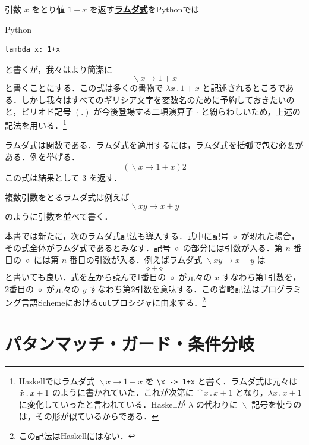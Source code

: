 \documentclass[a4paper,twocolumn]{jsbook}
\newcommand{\programminglanguage}[1]{\textsf{#1}}
\newcommand{\haskell}{\programminglanguage{Haskell}}
\newcommand{\python}{\programminglanguage{Python}}
\newcommand{\scheme}{\programminglanguage{Scheme}}
\newcommand{\keyword}[1]{{\underline{\textbf{#1}}}}
\newcommand{\code}[1]{\texttt{#1}}
\newenvironment{pythoncode}{\begin{itembox}[r]{\python}}{\end{itembox}}
\newcommand{\mAnonParam}{\diamond}
\DeclareMathOperator{\mLambda}{\backslash}
\DeclareMathOperator{\mLambdaArrow}{\rightarrow}
\newcommand{\mLambdaExp}[2]{\mLambda{#1}\mLambdaArrow{#2}}
\begin{document}
引数 $x$ をとり値 $1+x$ を返す\keyword{ラムダ式}を\python では
\begin{pythoncode}
\begin{verbatim}
lambda x: 1+x
\end{verbatim}
\end{pythoncode}
と書くが，我々はより簡潔に
\begin{equation}
\mLambdaExp{x}{1+x}
\end{equation}
と書くことにする．この式は多くの書物で $\lambda x\mathbin{.}1+x$ と記述されるところである．しかし我々はすべてのギリシア文字を変数名のために予約しておきたいのと，ピリオド記号 $(.)$ が今後登場する二項演算子 $\cdot$ と紛らわしいため，上述の記法を用いる．\footnote{\haskell ではラムダ式 $\mLambdaExp{x}{1+x}$ を \code{\textbackslash x -> 1+x} と書く．ラムダ式は元々は $\Hat x\mathbin{.}x+1$ のように書かれていた．これが次第に $\mathop{\texttt{\textasciicircum}}x\mathbin{.}x+1$ となり，$\lambda x\mathbin{.}x+1$ に変化していったと言われている．\haskell が $\lambda$ の代わりに $\mLambda$ 記号を使うのは，その形が似ているからである．}

ラムダ式は関数である．ラムダ式を適用するには，ラムダ式を括弧で包む必要がある．例を挙げる．
\begin{equation}
(\mLambdaExp{x}{1+x})2
\end{equation}
この式は結果として $3$ を返す．

複数引数をとるラムダ式は例えば
\begin{equation}
\mLambdaExp{xy}{x+y}
\end{equation}
のように引数を並べて書く．

本書では新たに，次のラムダ式記法も導入する．式中に記号 $\mAnonParam$ が現れた場合，その式全体がラムダ式であるとみなす．記号 $\mAnonParam$ の部分には引数が入る．第 $n$ 番目の $\mAnonParam$ には第 $n$ 番目の引数が入る．例えばラムダ式 $\mLambdaExp{xy}{x+y}$ は
\begin{equation}
\mAnonParam+\mAnonParam
\end{equation}
と書いても良い．式を左から読んで1番目の $\mAnonParam$ が元々の $x$ すなわち第1引数を，2番目の $\mAnonParam$ が元々の $y$ すなわち第2引数を意味する．この省略記法はプログラミング言語\scheme における\code{cut}プロシジャに由来する．\footnote{この記法は\haskell にはない．}

\section{パタンマッチ・ガード・条件分岐}
\end{document}
